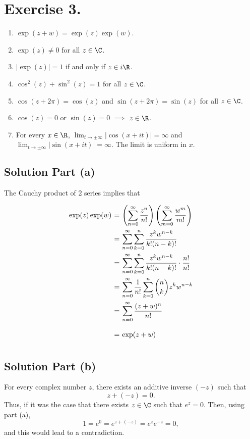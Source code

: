 \section*{Exercise 3.}

\begin{enumerate}[label=(\alph*)]
    \item $\exp(z+w) = \exp(z) \exp(w)$.
    \item $\exp(z) \neq 0$ for all $z\in\C$.
    \item $|\exp(z)| = 1$ if and only if $z\in i\R$.
    \item $\cos^2(z)+\sin^2(z) = 1$ for all $z \in \C$.
    \item $\cos(z+ 2\pi) = \cos(z)$ and $\sin(z+2\pi) = \sin(z)$ for all $z \in \C$.
    \item $\cos(z) = 0$ or $\sin(z) = 0$ $\implies$ $z\in\R$.
    \item For every $x\in\R$, $\lim_{t\to\pm\infty}|\cos(x+it)| = \infty $ and $\lim_{t\to\pm\infty}|\sin(x+it)| = \infty $. The limit is uniform in $x$.
\end{enumerate}

\subsection*{Solution Part (a)}
The Cauchy product of 2 series implies that
\[ \everymath{\displaystyle}
\arraycolsep=1.8pt\def\arraystretch{2.5}
\begin{array}{rcl}
    \exp (z) \exp (w) & = & \left( \sum_{n = 0}^{\infty} \frac{z^n}{n!} \right) \left( \sum_{m = 0}^{\infty} \frac{w^m}{m!} \right)\\
    & = & \sum_{n = 0}^{\infty} \sum_{k = 0}^n \frac{z^k w^{n-k}}{k!(n-k)!}\\
    & = & \sum_{n = 0}^{\infty} \sum_{k = 0}^n \frac{z^k w^{n-k}}{k!(n-k)!} \cdot \frac{n!}{n!}\\
    & = & \sum_{n = 0}^{\infty} \frac{1}{n!} \sum_{k = 0}^n \binom{n}{k} z^k w^{n-k}\\
    & = & \sum_{n = 0}^{\infty} \frac{(z+w)^n}{n!}\\
    & = & \exp(z+w)
\end{array} \]

\subsection*{Solution Part (b)}

For every complex number $z$, there exists an additive inverse $(-z)$ such that
\[ z + (-z) = 0. \]
Thus, if it was the case that there exists $z\in \C$ such that $e^z = 0$. Then, using part (a),
\[ 1 = e^0 = e^{z + (-z)} = e^{z} e^{-z} = 0, \]
and this would lead to a contradiction.

